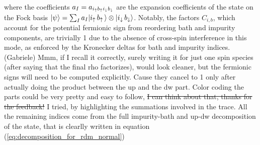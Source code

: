 \documentclass[edipack_sp.tex]{subfiles}
\begin{document}
where the coefficients $a_I = a_{i_\uparrow b_\uparrow i_\downarrow b_\downarrow}$ are the
expansion coefficients of the state on the Fock basis
$|\psi\rangle = \sum_I a_I |i_\uparrow\,  b_\uparrow\,\rangle \otimes |i_\downarrow
  \, b_\downarrow\rangle$.
Notably, the factors $C_{i,b}$, which account for the potential 
fermionic sign from reordering bath and impurity components, are 
trivially 1 due to the absence of cross-spin interference in this 
mode, as enforced by the Kronecker deltas for bath and impurity 
indices.
{\color{teal}(Gabriele) Mmm, if I recall it correctly, surely writing it for just
one spin species (after saying that the final rho factorizes), would look 
cleaner, but the fermionic signs will need to be computed explicitly. Cause
they cancel to 1 only after actually doing the product between the up and the
dw part. Color coding the parts could be very pretty and easy to follow,
\sout{I can think about that, thanks for the feedback!} I tried, by highlighting
the summations involved in the trace. All the remaining indices come from the
full impurity-bath and up-dw decomposition of the state, that is clearlly written
in equation (\ref{eq:decomposition_for_rdm_normal})}
\end{document}
